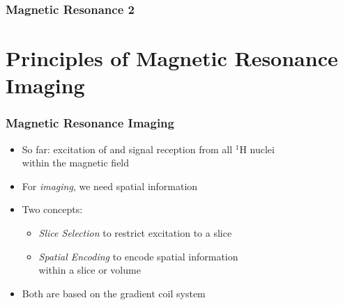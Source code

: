 

\usepackage[]{subcaption} 

\renewcommand{\vec}[1]{\boldsymbol{#1}}
\newcommand{\mat}[1]{\boldsymbol{#1}}

\newcommand\B[1]{\ensuremath{\vec{B}_{#1}}}

\def\longtime{\ensuremath{T_1}}						%
\def\transtime{\ensuremath{T_2}}						%
\def\inhomogtime{\ensuremath{\transtime^*}}						%

\def\spatialfreq{\ensuremath{s}}      %

\def\larmorfreq{\ensuremath{f_\ell}}  %

\def\hydrogen{\ensuremath{{}^1\textrm{H}}} %

\def\magn{\ensuremath{\vec M}}
\def\magnzero{\ensuremath{\magn_0}}
\def\magnlong{\ensuremath{\magn_z}} %
\def\magntrans{\ensuremath{\magn_{xy}}} %


\subtitle{Magnetic Resonance II}
\author{Prof.\ Andreas Maier, Jens Wetzl, Felix Lugauer}




\frame[plain]{\titlepage}

\begin{frame}
  \frametitle{Magnetic Resonance 2}
  
  \tableofcontents
\end{frame}

\section{Principles of Magnetic Resonance Imaging}%
\label{sec:principles_of_magnetic_resonance_imaging}

\begin{frame}
	\frametitle{Magnetic Resonance {\color{red}Imaging}}
	
	\begin{itemize}
		\item So far: excitation of and signal reception from all \hydrogen{} nuclei \\ within the magnetic field
		\item For \emph{imaging}, we need spatial information
		\item Two concepts:
		\begin{itemize}
			\item \emph{Slice Selection} to restrict excitation to a slice
			\item \emph{Spatial Encoding} to encode spatial information \\ within a slice or volume
		\end{itemize}
		\item Both are based on the gradient coil system
	\end{itemize}
\end{frame}

